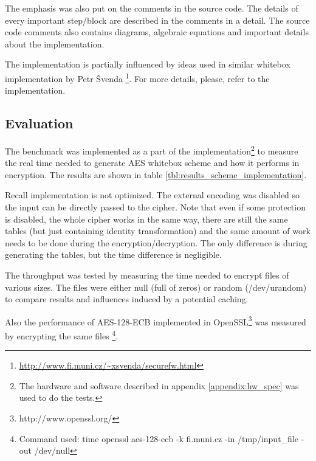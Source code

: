 \documentclass[11pt,oneside,final]{fithesis2}
\begin{document}
    The emphasis was also put on the comments in the source code. The details of every important step/block are described 
    in the comments in a detail. The source code comments also contains diagrams, algebraic equations and important details about the implementation.

    The implementation is partially influenced by ideas used in similar whitebox implementation by Petr \v{S}venda \footnote{\url{http://www.fi.muni.cz/~xsvenda/securefw.html}}. 
    For more details, please, refer to the implementation.
    
    \subsection{Evaluation}
    The benchmark was implemented as a part of the implementation\footnote{The hardware and software described in appendix \ref{appendix:hw_spec} was used to do the tests. } to measure
    the real time needed to generate AES whitebox scheme and how it performs in encryption. The results are shown in table \ref{tbl:results_scheme_implementation}.
    
    Recall implementation is not optimized. The external encoding was disabled so the input can be directly passed to the 
    cipher. Note that even if some protection is disabled, the whole cipher works in the same way, there are still the same
    tables (but just containing identity transformation) and the same amount of work needs to be done during the encryption/decryption. 
    The only difference is during generating the tables, but the time difference is negligible.

    The throughput was tested by measuring the time needed to encrypt files of various sizes. The files were either null (full of zeros) or random (/dev/urandom)
    to compare results and influences induced by a potential caching.
    
    Also the performance of AES-128-ECB implemented in OpenSSL\footnote{http://www.openssl.org/} was measured by encrypting the same 
    files \footnote{Command used: time openssl aes-128-ecb -k fi.muni.cz  -in /tmp/input\_file -out /dev/null }.
    
\end{document}
